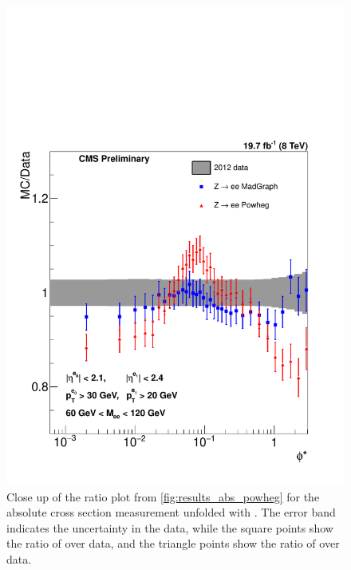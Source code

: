\begin{figure}[!p]
    \centering
    \includegraphics[width=\textwidth]{figures/ZShape_Ratioelec_PH_Abs_Dressed.pdf}
    \caption[
        Close up of the ratio plot from \cref{fig:results_abs_powheg} for
        the absolute cross section measurement unfolded with \POWHEG.
    ]{
        Close up of the ratio plot from \cref{fig:results_abs_powheg} for
        the absolute cross section measurement unfolded with \POWHEG. The error
        band indicates the uncertainty in the data, while the square points
        show the ratio of \MADGRAPH over data, and the triangle points show the
        ratio of \POWHEG over data.
    }
    \label{fig:results_ratio_abs_powheg}
\end{figure}
